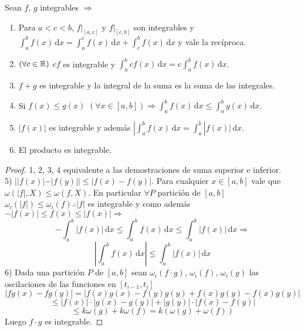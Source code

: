 \begin{theorem}
  Sean $f$, $g$ integrables $\Rightarrow$ \begin{enumerate}
    \item Para $a < c < b$, $f|_{[a, c]}$ y $f|_{[c, b]}$ son integrables y $\int_a^b f(x)\, \mathrm{d}x = \int_a^c f(x)\, \mathrm{d}x + \int_c^b f(x)\, \mathrm{d}x$ y vale la recíproca.
    \item $(\forall c \in \mathbb{R})$ $c f$ es integrable y $\int_a^b c f(x)\, \mathrm{d}x = c \int_a^b f(x)\, \mathrm{d}x$.
    \item $f+g$ es integrable y la integral de la suma es la suma de las integrales.
    \item Si $f(x) \leq g(x)$ $(\forall x \in [a, b]) \Rightarrow \int_a^b f(x) \, \mathrm{d}x \leq \int_a^b g(x) \, \mathrm{d}x$.
    \item $|f(x)|$ es integrable y además $|\int_a^b f(x) \, \mathrm{d}x = \int_a^b |f(x)| \, \mathrm{d}x$.
    \item El producto es integrable.
  \end{enumerate}
  \begin{proof}
    1, 2, 3, 4 equivalente a las demostraciones de suma superior e inferior. \\
    5) $| |f(x)| - |f(y)|| \leq |f(x) - f(y)|$. Para cualquier $x \in [a, b]$ vale que $\omega(|f|, X) \leq \omega(f, X)$. En particular $\forall P$ partición de $[a, b]$ $\omega_i(|f|) \leq \omega_i(f) \therefore |f|$ es integrable y como además $-|f(x)| \leq f(x) \leq |f(x)| \Rightarrow$ \begin{equation}
      -\int_a^b |f(x)| \, \mathrm{d}x \leq \int_a^b f(x) \, \mathrm{d}x \leq \int_a^b |f(x)| \, \mathrm{d}x \Rightarrow
    \end{equation}
    \begin{equation}
      | \int_a^b f(x) \, \mathrm{d}x | \leq \int_a^b |f(x)| \, \mathrm{d}x
    \end{equation}
    6) Dada una partición $P$ de $[a, b]$ sean $\omega_i(f \cdot g)$, $\omega_i(f)$, $\omega_i(g)$ las oscilaciones de las funciones en $[t_{i-1}, t_i]$ \begin{equation}
      |fg(x) - fg(y)| = |f(x)g(x) - f(y)g(y) + f(x)g(y) - f(x)g(y)|
    \end{equation}
    \begin{equation}
      \leq |f(x)| \cdot |g(x)- g(y)| + |g(y)| \cdot |f(x) - f(y)|
    \end{equation}
    \begin{equation}
      \leq k \omega(g) + k \omega(f) = k (\omega(g) + \omega(f))
    \end{equation} Luego $f \cdot g$ es integrable.
  \end{proof}
\end{theorem}

